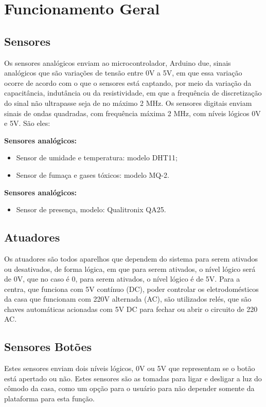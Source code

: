 \chapter{Funcionamento Geral}

\section{Sensores}
\par Os sensores analógicos enviam ao microcontrolador, Arduino due, sinais analógicos que são variações de tensão entre 0V a 5V, em que essa variação ocorre de acordo com o que o sensores está captando, por meio da variação da capacitância, indutância ou da resistividade, em que a frequência de discretização do sinal não ultrapasse  seja de no máximo 2 MHz. Os sensores digitais enviam sinais de ondas quadradas, com frequência máxima 2 MHz, com níveis lógicos 0V e 5V. São eles:
\par \textbf{Sensores analógicos:}
    \begin{itemize}
        \item Sensor de umidade e temperatura: modelo DHT11;
        \item Sensor de fumaça e gases tóxicos: modelo  MQ-2.
    \end{itemize}
\par \textbf{Sensores analógicos:}
    \begin{itemize}
        \item Sensor de presença, modelo: Qualitronix QA25.
    \end{itemize}

\section{Atuadores}
\par Os atuadores são todos aparelhos que dependem do sistema para serem ativados ou desativados, de forma lógica, em que para serem ativados, o nível lógico será de 0V, que no caso é 0, para serem ativados, o nível lógico é de 5V. Para a centra, que funciona com 5V contínuo (DC), poder controlar os eletrodomésticos da casa que funcionam com 220V alternada (AC), são utilizados relés, que são chaves automáticas acionadas com 5V DC para fechar ou abrir o circuito de 220 AC.

\section{Sensores Botões}
\par Estes sensores enviam dois níveis lógicos, 0V ou 5V que representam se o botão está apertado ou não. Estes sensores são as tomadas para ligar e desligar a  luz do cômodo da casa, como um opção para o usuário para não depender somente da plataforma para esta função.

